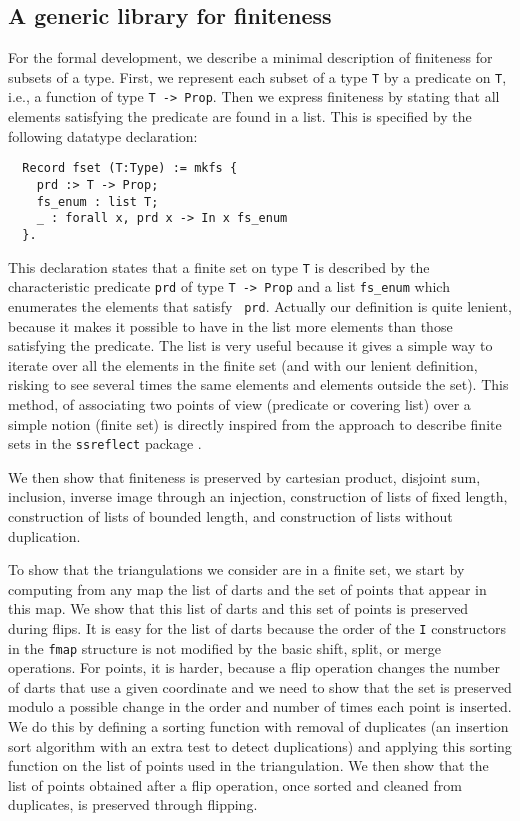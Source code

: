\documentclass{llncs}
\begin{document}
\subsection{A generic library for finiteness}
For the formal development, we describe a minimal description of finiteness for subsets of a type.  First, we represent each subset of a type {\tt T} by a predicate on {\tt T}, i.e., a function of type {\tt T -> Prop}.  Then we express finiteness by stating that all elements satisfying the predicate are found in a list. This is specified by the following datatype declaration:

\begin{verbatim}
  Record fset (T:Type) := mkfs {
    prd :> T -> Prop;
    fs_enum : list T;
    _ : forall x, prd x -> In x fs_enum
  }.
\end{verbatim}
This declaration states that a finite set on type {\tt T} is described
by the characteristic predicate {\tt prd} of type {\tt T -> Prop} and
a list {\tt fs\_enum} which enumerates the elements that satisfy {\tt
  prd}.  Actually our definition is quite lenient, because it makes it
possible to have in the list more elements than those satisfying the
predicate.  The list is very useful because it gives a simple way to
iterate over all the elements in the finite set (and with
our lenient definition, risking to see several times the
same elements and elements outside the set).  This
method, of associating two points of view (predicate or covering list)
over a simple notion (finite set) is directly inspired from the approach
to describe finite sets in the {\tt ssreflect} package \cite{GMRTT:GROUPS07}.

We then show that finiteness is preserved by cartesian product, 
disjoint sum, inclusion, inverse image through an injection, construction
of lists of fixed length, construction of lists of bounded length,
and construction of lists without duplication.

To show that the triangulations we consider are in a finite set, we
start by computing from any map the list of darts and the set of points
that appear in this map.  We show that this list of darts and this set of
points is preserved during flips.  It is easy for the list of darts because
the order of the {\tt I} constructors in the {\tt fmap} structure is not
modified by the basic shift, split, or merge operations.  For points, it is
harder, because a flip operation changes the number of darts that use
a given coordinate and we need to show that the set is preserved modulo
a possible change in the order and number of times each point is inserted.
We do this by defining a sorting function with removal of duplicates (an
insertion sort algorithm with an extra test to detect duplications) and applying
this sorting function on the list of points used in the triangulation.  We then
show that the list of points obtained after a flip operation, once sorted and
cleaned from duplicates, is preserved through flipping.
\end{document}
